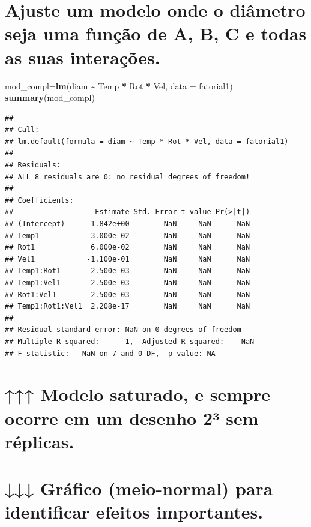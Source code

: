 \documentclass[
]{article}
\newenvironment{Shaded}{\begin{snugshade}}{\end{snugshade}}
\newcommand{\AttributeTok}[1]{\textcolor[rgb]{0.13,0.29,0.53}{#1}}
\newcommand{\FunctionTok}[1]{\textcolor[rgb]{0.13,0.29,0.53}{\textbf{#1}}}
\newcommand{\NormalTok}[1]{#1}
\newcommand{\OtherTok}[1]{\textcolor[rgb]{0.56,0.35,0.01}{#1}}
\newcommand{\SpecialCharTok}[1]{\textcolor[rgb]{0.81,0.36,0.00}{\textbf{#1}}}
\begin{document}
\section{Ajuste um modelo onde o diâmetro seja uma função de A, B, C e
todas as suas
interações.}\label{ajuste-um-modelo-onde-o-diuxe2metro-seja-uma-funuxe7uxe3o-de-a-b-c-e-todas-as-suas-interauxe7uxf5es.}

\begin{Shaded}
\begin{Highlighting}[]
\NormalTok{mod\_compl}\OtherTok{=}\FunctionTok{lm}\NormalTok{(diam }\SpecialCharTok{\textasciitilde{}}\NormalTok{ Temp }\SpecialCharTok{*}\NormalTok{ Rot }\SpecialCharTok{*}\NormalTok{ Vel, }\AttributeTok{data =}\NormalTok{ fatorial1)}
\FunctionTok{summary}\NormalTok{(mod\_compl)}
\end{Highlighting}
\end{Shaded}

\begin{verbatim}
## 
## Call:
## lm.default(formula = diam ~ Temp * Rot * Vel, data = fatorial1)
## 
## Residuals:
## ALL 8 residuals are 0: no residual degrees of freedom!
## 
## Coefficients:
##                   Estimate Std. Error t value Pr(>|t|)
## (Intercept)      1.842e+00        NaN     NaN      NaN
## Temp1           -3.000e-02        NaN     NaN      NaN
## Rot1             6.000e-02        NaN     NaN      NaN
## Vel1            -1.100e-01        NaN     NaN      NaN
## Temp1:Rot1      -2.500e-03        NaN     NaN      NaN
## Temp1:Vel1       2.500e-03        NaN     NaN      NaN
## Rot1:Vel1       -2.500e-03        NaN     NaN      NaN
## Temp1:Rot1:Vel1  2.208e-17        NaN     NaN      NaN
## 
## Residual standard error: NaN on 0 degrees of freedom
## Multiple R-squared:      1,  Adjusted R-squared:    NaN 
## F-statistic:   NaN on 7 and 0 DF,  p-value: NA
\end{verbatim}

\section{↑↑↑ Modelo saturado, e sempre ocorre em um desenho 2³ sem
réplicas.}\label{modelo-saturado-e-sempre-ocorre-em-um-desenho-2uxb3-sem-ruxe9plicas.}

\section{↓↓↓ Gráfico (meio-normal) para identificar efeitos
importantes.}\label{gruxe1fico-meio-normal-para-identificar-efeitos-importantes.}
\end{document}
